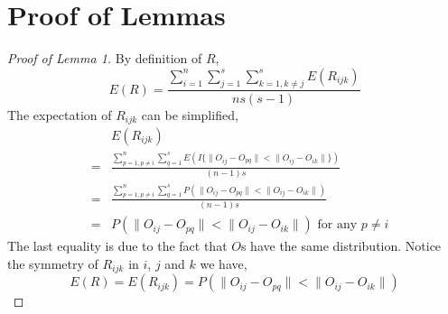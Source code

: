 \documentclass[11pt,journal,compsoc]{IEEEtran}
\begin{document}
\section{Proof of Lemmas}
\begin{proof}[Proof of Lemma 1]
By definition of $R$,
\[E(R)= \frac{\sum\limits_{i=1}^{n} \sum\limits_{j=1}^{s}  \sum\limits_{k=1,k\neq j}^{s} E(R_{ijk})}{ns(s-1)}\]
The expectation of $R_{ijk}$ can be simplified,
\begin{eqnarray*}  
& &E(R_{ijk}) \\
&=&\frac{\sum\limits_{p=1,p\neq i}^{n} \sum\limits_{q=1}^{s} E(I\{\|O_{ij}-O_{pq}\| < \|O_{ij}-O_{ik}\| \}) }{(n-1)s} \\
&=&\frac{\sum\limits_{p=1,p\neq i}^{n} \sum\limits_{q=1}^{s} P(\|O_{ij}-O_{pq}\| < \|O_{ij}-O_{ik}\| ) }{(n-1)s} \\
&=&P(\|O_{ij}-O_{pq}\| < \|O_{ij}-O_{ik}\|) \text{ for any $p\neq i$}
\end{eqnarray*}
The last equality is due to the fact that $O$s have the same distribution. Notice the symmetry of $R_{ijk}$ in $i$, $j$ and $k$ we have,
\[E(R)=E(R_{ijk})=P(\|O_{ij}-O_{pq}\| < \|O_{ij}-O_{ik}\|)\]
\end{proof}
\end{document}
